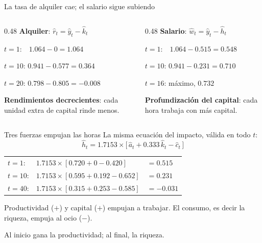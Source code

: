 \begin{frame}[label=acto2-precios]{La tasa de alquiler cae; el salario sigue subiendo}
  \begin{columns}[T,onlytextwidth]
    \begin{column}{0.48\textwidth}
      \textbf{Alquiler}: $\hat r_t=\hat y_t-\hat k_t$\par
      \vspace{0.2cm}
      $t=1$:\ \ $1.064-0=1.064$\par
      $t=10$: $0.941-0.577=0.364$\par
      $t=20$: $0.798-0.805=-0.008$\par
      \vspace{0.3cm}
      \textbf{Rendimientos decrecientes}: cada unidad extra de capital rinde menos.
    \end{column}
    \begin{column}{0.48\textwidth}
      \textbf{Salario}: $\hat w_t=\hat y_t-\hat h_t$\par
      \vspace{0.2cm}
      $t=1$:\ \ $1.064-0.515=0.548$\par
      $t=10$: $0.941-0.231=0.710$\par
      $t=16$: máximo, $0.732$\par
      \vspace{0.3cm}
      \textbf{Profundización del capital}: cada hora trabaja con más capital.
    \end{column}
  \end{columns}
\end{frame}

\begin{frame}[label=acto2-horas]{Tres fuerzas empujan las horas}
  La misma ecuación del impacto, válida en todo $t$:
  \[
  \hat h_t=1.7153\times\big[\,\hat a_t+0.333\,\hat k_t-\hat c_t\,\big]
  \]
  \par\vspace{0.05cm}
  \begin{tabular}{@{}lll@{}}
    $t=1$: & $1.7153\times[0.720+0-0.420]$ & $=0.515$\\
    $t=10$: & $1.7153\times[0.595+0.192-0.652]$ & $=0.231$\\
    $t=40$: & $1.7153\times[0.315+0.253-0.585]$ & $=-0.031$
  \end{tabular}
  \par\vspace{0.35cm}
  Productividad ($+$) y capital ($+$) empujan a trabajar. El consumo, es decir la
  riqueza, empuja al ocio ($-$).\par
  \vspace{0.2cm}
  Al inicio gana la productividad; al final, la riqueza.
\end{frame}

